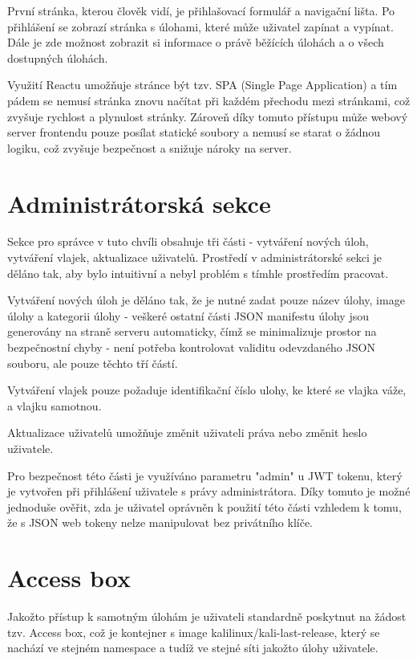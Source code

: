 \documentclass[12pt, a4paper,
oneside,      %
openright
]{report}
\begin{document}
První stránka, kterou člověk vidí, je přihlašovací formulář a navigační lišta. Po přihlášení se zobrazí stránka s úlohami, které může uživatel zapínat a vypínat. Dále je zde možnost zobrazit si informace o právě běžících úlohách a o všech dostupných úlohách.

Využití Reactu umožňuje stránce být tzv. SPA (Single Page Application) a tím pádem se nemusí stránka znovu načítat při každém přechodu mezi stránkami, což zvyšuje rychlost a plynulost stránky. Zároveň díky tomuto přístupu může webový server frontendu pouze posílat statické soubory a nemusí se starat o žádnou logiku, což zvyšuje bezpečnost a snižuje nároky na server.

\section{Administrátorská sekce}
Sekce pro správce v tuto chvíli obsahuje tři části - vytváření nových úloh, vytváření vlajek, aktualizace uživatelů. Prostředí v administrátorské sekci je děláno tak, aby bylo intuitivní a nebyl problém s tímhle prostředím pracovat. 

Vytváření nových úloh je děláno tak, že je nutné zadat pouze název úlohy, image úlohy a kategorii úlohy - veškeré ostatní části JSON manifestu úlohy jsou generovány na straně serveru automaticky, čímž se minimalizuje prostor na bezpečnostní chyby - není potřeba kontrolovat validitu odevzdaného JSON souboru, ale pouze těchto tří částí. 

Vytváření vlajek pouze požaduje identifikační číslo ulohy, ke které se vlajka váže, a vlajku samotnou.

Aktualizace uživatelů umožňuje změnit uživateli práva nebo změnit heslo uživatele.

Pro bezpečnost této části je využíváno parametru "admin" u JWT tokenu, který je vytvořen při přihlášení uživatele s právy administrátora. Díky tomuto je možné jednoduše ověřit, zda je uživatel oprávněn k použití této části vzhledem k tomu, že s JSON web tokeny nelze manipulovat bez privátního klíče.

\section{Access box}
Jakožto přístup k samotným úlohám je uživateli standardně poskytnut na žádost tzv. Access box, což je kontejner s image kalilinux/kali-last-release, který se nachází ve stejném namespace a tudíž ve stejné síti jakožto úlohy uživatele. 
\end{document}
